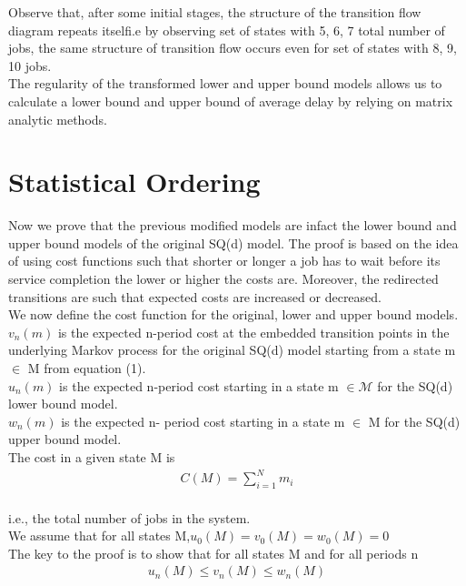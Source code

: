 \documentclass[a4paper,english,12pt]{article}
\begin{document}
Observe that, after some initial stages, the structure of the transition flow diagram repeats itselfi.e by observing set of states with 5, 6, 7 total number of jobs, the same structure of transition flow occurs even for set of states with 8, 9, 10 jobs.
\\The regularity of the transformed lower and upper bound models allows us to calculate a lower bound and upper bound of average delay by relying on matrix analytic methods. 

\section{Statistical Ordering}
Now we prove that the previous modified models are infact the lower bound and upper bound models of the original SQ(d) model. The proof is based on the idea of using cost functions such that shorter or longer a job has to wait before its service completion the lower or higher the costs are.
Moreover, the redirected transitions are such that expected costs are increased or decreased.
\\We now define the cost function for the original, lower and upper bound models.
\\$v_n(m)$ is the expected n-period cost at the embedded transition points in the underlying Markov process for the original SQ(d) model starting from a state m $\in$ M from equation (1).
\\$u_n(m)$ is the expected n-period cost starting in a state m $\in \mathcal{M}$ for the SQ(d) lower bound model.
\\$w_n(m)$ is the expected n- period cost starting in a state m $\in$ M for the SQ(d) upper bound model.
\\The cost in a given state M is 
\begin{align*}
C(M)=\sum_{i=1}^{N}m_i
\end{align*}
\\i.e., the total number of jobs in the system.
\\We assume that for all states M,$ u_0(M)=v_0(M)=w_0(M)=0$
\\The key to the proof is to show that for all states M and for all periods n
\begin{align*}
u_n(M)\le v_n(M)\le w_n(M) \tag{4}
\end{align*}                             
\end{document}

